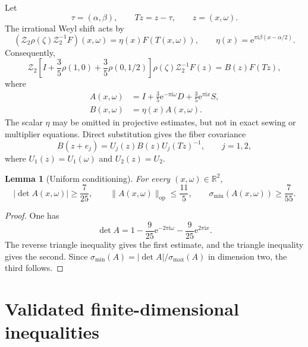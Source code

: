 \documentclass[10pt,a4paper]{amsart}
\numberwithin{equation}{section}
\newtheorem{lemma}[theorem]{Lemma}
\newcommand{\R}{\mathbb R}
\newcommand{\cZtwo}{\mathcal Z_2}
\newcommand{\norm}[1]{\lVert #1\rVert}
\newcommand{\abs}[1]{\lvert #1\rvert}
\newcommand{\e}{\mathrm e}
\newcommand{\ii}{\mathrm i}
\begin{document}
Let
\begin{equation}\label{eq:base-map}
 \tau=(\alpha,\beta),\qquad Tz=z-\tau,\qquad z=(x,\omega).
\end{equation}
The irrational Weyl shift acts by
\begin{equation}\label{eq:irrational-action}
 (\cZtwo\rho(\zeta)\cZtwo^{-1}F)(x,\omega)
 =\eta(x)F(T(x,\omega)),\qquad
 \eta(x)=\e^{\pi\ii\beta(x-\alpha/2)}.
\end{equation}
Consequently,
\begin{equation}\label{eq:zak-cocycle-action}
 \cZtwo\left[I+\frac35\rho(1,0)+\frac35\rho(0,1/2)\right]
 \rho(\zeta)\cZtwo^{-1}F(z)=B(z)F(Tz),
\end{equation}
where
\begin{align}
 A(x,\omega)&=I+\frac35\e^{-\pi\ii\omega}D
                  +\frac35\e^{\pi\ii x}S,\label{eq:A-definition}\\
 B(x,\omega)&=\eta(x)A(x,\omega).\label{eq:B-definition}
\end{align}
The scalar $\eta$ may be omitted in projective estimates, but not in exact
sewing or multiplier equations.  Direct substitution gives the fiber
covariance
\begin{equation}\label{eq:B-covariance}
 B(z+e_j)=U_j(z)B(z)U_j(Tz)^{-1},\qquad j=1,2,
\end{equation}
where $U_1(z)=U_1(\omega)$ and $U_2(z)=U_2$.

\begin{lemma}[Uniform conditioning]\label{lem:conditioning}
For every $(x,\omega)\in\R^2$,
\begin{equation}\label{eq:conditioning}
 \abs{\det A(x,\omega)}\ge\frac7{25},\qquad
 \norm{A(x,\omega)}_{\mathrm{op}}\le\frac{11}{5},\qquad
 \sigma_{\min}(A(x,\omega))\ge\frac7{55}.
\end{equation}
\end{lemma}

\begin{proof}
One has
\[
 \det A=1-\frac9{25}\e^{-2\pi\ii\omega}
          -\frac9{25}\e^{2\pi\ii x}.
\]
The reverse triangle inequality gives the first estimate, and the triangle
inequality gives the second.  Since
$\sigma_{\min}(A)=|\det A|/\sigma_{\max}(A)$ in dimension two, the third
follows.
\end{proof}

\section{Validated finite-dimensional inequalities}
\label{sec:certificates}
\end{document}
